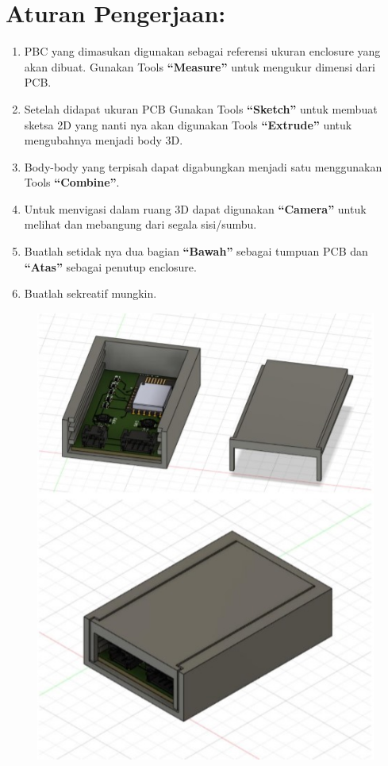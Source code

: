 \section{Aturan Pengerjaan:}
\begin{enumerate}
    \item PBC yang dimasukan digunakan sebagai referensi ukuran enclosure yang akan dibuat. Gunakan
    Tools \textbf{“Measure”} untuk mengukur dimensi dari PCB.
    \item Setelah didapat ukuran PCB Gunakan Tools \textbf{“Sketch”} untuk membuat sketsa 2D yang nanti nya
    akan digunakan Tools \textbf{“Extrude”} untuk mengubahnya menjadi body 3D.
    \item Body-body yang terpisah dapat digabungkan menjadi satu menggunakan Tools \textbf{“Combine”}.
    \item Untuk menvigasi dalam ruang 3D dapat digunakan \textbf{“Camera”} untuk melihat dan mebangung
    dari segala sisi/sumbu.
    \item Buatlah setidak nya dua bagian \textbf{“Bawah”} sebagai tumpuan PCB dan \textbf{“Atas”} sebagai penutup
    enclosure.
    \item Buatlah sekreatif mungkin.
\end{enumerate}

\begin{figure}[H]
    \centering
    \includegraphics[width=0.6\linewidth]{P3/img/image11.jpg}
\end{figure}